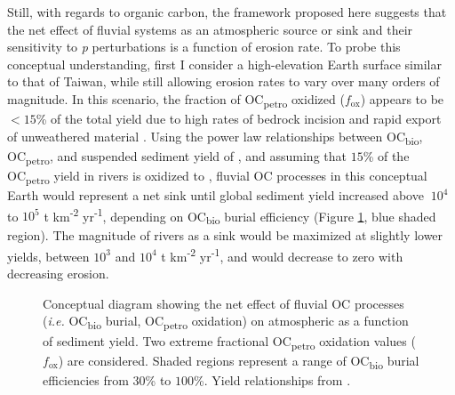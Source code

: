 Still, with regards to organic carbon, the framework proposed here suggests that the net effect of fluvial systems as an atmospheric  source or sink and their sensitivity to \textit{p} perturbations is a function of erosion rate. To probe this conceptual understanding, first I consider a high-elevation Earth surface similar to that of Taiwan, while still allowing erosion rates to vary over many orders of magnitude. In this scenario, the fraction of OC\textsubscript{petro} oxidized ($f_{\text{ox}}$) appears to be $<15$\% of the total yield due to high rates of bedrock incision and rapid export of unweathered material \citep{Hilton:2011jw}. Using the power law relationships between OC\textsubscript{bio}, OC\textsubscript{petro}, and suspended sediment yield of \citet{Galy:2015fx}, and assuming that $15$\% of the OC\textsubscript{petro} yield in rivers is oxidized to , fluvial OC processes in this conceptual Earth would represent a net  sink until global sediment yield increased above $~ 10^4$ to $10^5$ t km\textsuperscript{-2} yr\textsuperscript{-1}, depending on OC\textsubscript{bio} burial efficiency (Figure \ref{Ch7Fig:2}, blue shaded region). The magnitude of rivers as a  sink would be maximized at slightly lower yields, between $10^3$ and $10^4$ t km\textsuperscript{-2} yr\textsuperscript{-1}, and would decrease to zero with decreasing erosion.

\begin{figure}[h]
	\caption[Riverine  source/sink as a function of sediment yield]{Conceptual diagram showing the net effect of fluvial OC processes (\textit{i.e.} OC\textsubscript{bio} burial, OC\textsubscript{petro} oxidation) on atmospheric  as a function of sediment yield. Two extreme fractional OC\textsubscript{petro} oxidation values ($f_{\text{ox}}$) are considered. Shaded regions represent a range of OC\textsubscript{bio} burial efficiencies from $30$\% to $100$\%. Yield relationships from \citet{Galy:2015fx}.}
	\label{Ch7Fig:2}
\end{figure}

